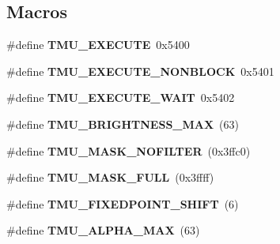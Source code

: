 \subsection*{Macros}
\begin{DoxyCompactItemize}
\item 
\mbox{\label{group__lm32__milkymist__tmu_ga355bd860894ad693974bf9294ec16800}} 
\#define {\bfseries T\+M\+U\+\_\+\+E\+X\+E\+C\+U\+TE}~0x5400
\item 
\mbox{\label{group__lm32__milkymist__tmu_ga2a9c476df4706809a2a087d2bb56968b}} 
\#define {\bfseries T\+M\+U\+\_\+\+E\+X\+E\+C\+U\+T\+E\+\_\+\+N\+O\+N\+B\+L\+O\+CK}~0x5401
\item 
\mbox{\label{group__lm32__milkymist__tmu_ga278ca8f5c8644d55a6f4348a0aa62b47}} 
\#define {\bfseries T\+M\+U\+\_\+\+E\+X\+E\+C\+U\+T\+E\+\_\+\+W\+A\+IT}~0x5402
\item 
\mbox{\label{group__lm32__milkymist__tmu_ga2ec39300900b94065ff8c3d72ae8dae2}} 
\#define {\bfseries T\+M\+U\+\_\+\+B\+R\+I\+G\+H\+T\+N\+E\+S\+S\+\_\+\+M\+AX}~(63)
\item 
\mbox{\label{group__lm32__milkymist__tmu_ga3b1476af97150d44534c972455ed12a0}} 
\#define {\bfseries T\+M\+U\+\_\+\+M\+A\+S\+K\+\_\+\+N\+O\+F\+I\+L\+T\+ER}~(0x3ffc0)
\item 
\mbox{\label{group__lm32__milkymist__tmu_ga360e971cc1213d23a50a55df2d1f70c4}} 
\#define {\bfseries T\+M\+U\+\_\+\+M\+A\+S\+K\+\_\+\+F\+U\+LL}~(0x3ffff)
\item 
\mbox{\label{group__lm32__milkymist__tmu_ga420d5da68323ead711c0d647ca55d79d}} 
\#define {\bfseries T\+M\+U\+\_\+\+F\+I\+X\+E\+D\+P\+O\+I\+N\+T\+\_\+\+S\+H\+I\+FT}~(6)
\item 
\mbox{\label{group__lm32__milkymist__tmu_ga6202761056ee6e3dc42db14c1695260b}} 
\#define {\bfseries T\+M\+U\+\_\+\+A\+L\+P\+H\+A\+\_\+\+M\+AX}~(63)
\item 
\mbox{\label{group__lm32__milkymist__tmu_gaf6c152ddfd56df31297da3c7edefeb09}} 

\end{DoxyCompactItemize}
